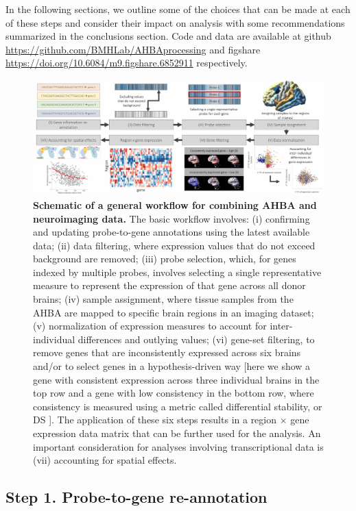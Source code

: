 \documentclass[10pt,A4]{article}
\begin{document}
In the following sections, we outline some of the choices that can be made at each of these steps and consider their impact on analysis with some recommendations summarized in the conclusions section. Code and data are available at github \url{https://github.com/BMHLab/AHBAprocessing} and figshare \url{https://doi.org/10.6084/m9.figshare.6852911} respectively.

\begin{figure}[h!]
  \centering
    \includegraphics[width=1\textwidth]{Ch4Fig2.pdf}
\caption{\textbf{Schematic of a general workflow for combining AHBA and neuroimaging data.} The basic workflow involves: (i) confirming and updating probe-to-gene annotations using the latest available data; (ii) data filtering, where expression values that do not exceed background are removed; (iii) probe selection, which, for genes indexed by multiple probes, involves selecting a single representative measure to represent the expression of that gene across all donor brains; (iv) sample assignment, where tissue samples from the AHBA are mapped to specific brain regions in an imaging dataset; (v) normalization of expression measures to account for inter-individual differences and outlying values; (vi) gene-set filtering, to remove genes that are inconsistently expressed across six brains and/or to select genes in a hypothesis-driven way [here we show a gene with consistent expression across three individual brains in the top row and a gene with low consistency in the bottom row, where consistency is measured using a metric called differential stability, or DS \citep{Hawrylycz2015}]. The application of these six steps results in a region $\times$ gene expression data matrix that can be further used for the analysis. An important consideration for analyses involving transcriptional data is (vii) accounting for spatial effects.}

\label{fig:Ch4Fig2}
\end{figure}

\subsection*{Step 1. Probe-to-gene re-annotation}
\end{document}
